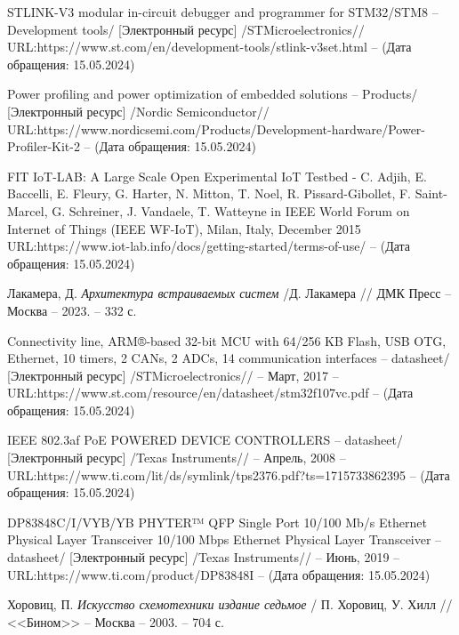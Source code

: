 \begin{thebibliography}{00}



 STLINK-V3 modular in-circuit debugger and programmer for STM32/STM8
-- Development tools/
[Электронный ресурс]
/STMicroelectronics//
URL:https://www.st.com/en/development-tools/stlink-v3set.html --
(Дата обращения: 15.05.2024)

 Power profiling and power optimization of embedded solutions
-- Products/
[Электронный ресурс]
/Nordic Semiconductor//
URL:https://www.nordicsemi.com/Products/Development-hardware/Power-Profiler-Kit-2 --
(Дата обращения: 15.05.2024)

 FIT IoT-LAB: A Large Scale Open Experimental IoT Testbed - C. Adjih, 
E. Baccelli, E. Fleury, G. Harter, N. Mitton, T. Noel, R. Pissard-Gibollet,
 F. Saint-Marcel, G. Schreiner, J. Vandaele, T. Watteyne in IEEE World Forum on Internet of Things 
 (IEEE WF-IoT), Milan, Italy, December 2015
URL:https://www.iot-lab.info/docs/getting-started/terms-of-use/ --
(Дата обращения: 15.05.2024)


 Лакамера, Д.
\emph{Архитектура встраиваемых систем} /Д. Лакамера // ДМК Пресс --
Москва -- 2023. -- 332 с.

 Connectivity line, ARM®-based 32-bit MCU with 64/256 KB Flash,
 USB OTG, Ethernet, 10 timers, 2 CANs, 2 ADCs, 14 communication interfaces -- datasheet/
  [Электронный ресурс]
 /STMicroelectronics// -- Март, 2017 -- 
 URL:https://www.st.com/resource/en/datasheet/stm32f107vc.pdf --
 (Дата обращения: 15.05.2024)

 IEEE 802.3af PoE POWERED DEVICE CONTROLLERS -- datasheet/
  [Электронный ресурс] /Texas Instruments// -- Апрель, 2008 
  -- URL:https://www.ti.com/lit/ds/symlink/tps2376.pdf?ts=1715733862395 --
  (Дата обращения: 15.05.2024)

 DP83848C/I/VYB/YB PHYTER™ QFP Single Port 10/100 Mb/s Ethernet
Physical Layer Transceiver
   10/100 Mbps Ethernet
  Physical Layer Transceiver -- datasheet/
  [Электронный ресурс] /Texas Instruments// -- Июнь, 2019 
  -- URL:https://www.ti.com/product/DP83848I --
  (Дата обращения: 15.05.2024)

 Хоровиц, П.
\emph{Искусство схемотехники издание седьмое} / П. Хоровиц, У. Хилл // <<Бином>> --
Москва -- 2003. -- 704 с.


\end{thebibliography}
